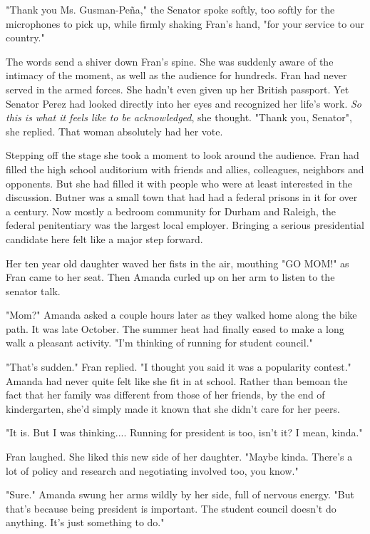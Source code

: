 \documentclass{article}
\begin{document}
"Thank you Ms. Gusman-Pe\~{n}a," the Senator spoke softly, too softly for the microphones to pick up, while firmly shaking Fran's hand, "for your service to our country." 

The words send a shiver down Fran's spine. She was suddenly aware of the intimacy of the moment, as well as the audience for hundreds. Fran had never served in the armed forces. She hadn’t even given up her British passport. Yet Senator Perez had looked directly into her eyes and recognized her life's work. \emph{So this is what it feels like to be acknowledged}, she thought. "Thank you, Senator", she replied. That woman absolutely had her vote.

Stepping off the stage she took a moment to look around the audience. Fran had filled the high school auditorium with friends and allies, colleagues, neighbors and opponents. But she had filled it with people who were at least interested in the discussion. Butner was a small town that had had a federal prisons in it for over a century. Now mostly a bedroom community for Durham and Raleigh, the federal penitentiary was the largest local employer. Bringing a serious presidential candidate here felt like a major step forward.

Her ten year old daughter waved her fists in the air, mouthing "GO MOM!" as Fran came to her seat. Then Amanda curled up on her arm to listen to the senator talk.

\vspace{.5 cm}

"Mom?" Amanda asked a couple hours later as they walked home along the bike path. It was late October. The summer heat had finally eased to make a long walk a pleasant activity. "I'm thinking of running for student council."

"That's sudden." Fran replied. "I thought you said it was a popularity contest." Amanda had never quite felt like she fit in at school. Rather than bemoan the fact that her family was different from those of her friends, by the end of kindergarten, she’d simply made it known that she didn’t care for her peers.

"It is. But I was thinking.... Running for president is too, isn't it? I mean, kinda."

Fran laughed. She liked this new side of her daughter. "Maybe kinda. There's a lot of policy and research and negotiating involved too, you know."

"Sure." Amanda swung her arms wildly by her side, full of nervous energy. "But that's because being president is important. The student council doesn't do anything. It’s just something to do."
\end{document}
